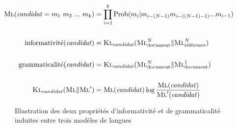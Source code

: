         \begin{align}
          \textsc{Ml}(\text{\textit{candidat}} = m_1\ m_2\ ...\ m_k) &=
          \prod_{i = 1}^k \text{Prob}(m_i | m_{i - (N - 1)} m_{i - ((N - 1) -
          1)} ... m_{i - 1}) \label{math:ml}\\
          \notag\\
          \text{informativité}(\text{\textit{candidat}}) &= \textsc{Kl}_{\text{\textit{candidat}}}(\textsc{Ml}_{\text{document}}^{N} \| \textsc{Ml}_{\text{référence}}^{N}) \label{math:informativeness}\\
          \notag\\
          \text{grammaticalité}(\text{\textit{candidat}}) &= \textsc{Kl}_{\text{\textit{candidat}}}(\textsc{Ml}_{\text{document}}^{N} \| \textsc{Ml}_{\text{document}}^{1}) \label{math:phraseness}\\
          \notag\\
          \textsc{Kl}_{\text{\textit{candidat}}}(\textsc{Ml} \| \textsc{Ml}') &= \textsc{Ml}(\text{\textit{candidat}}) \log \frac{\textsc{Ml}(\text{\textit{candidat}})}{\textsc{Ml}'(\text{\textit{candidat}})} \label{math:kullbackleibler}
        \end{align}
        \begin{figure}
          \centering


          \caption{Illustration des deux propriétés d'informativité et de
                   grammaticalité induites entre trois modèles de
                   langues~\cite{tomokiyo2003languagemodel}
                   \label{fig:klml}}
        \end{figure}

